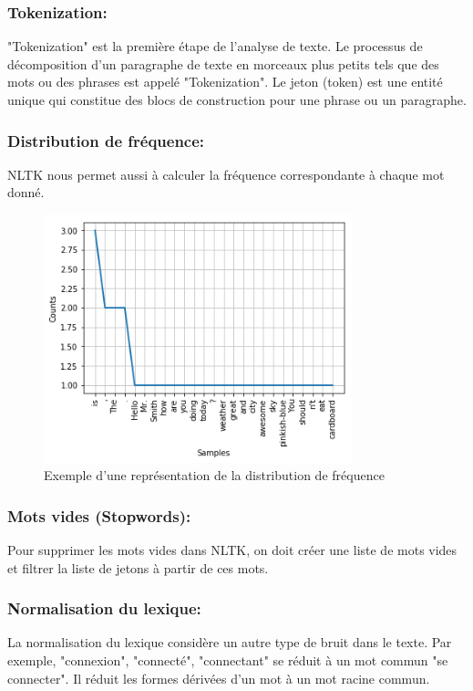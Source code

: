 \subsubsection{Tokenization:}
"Tokenization" est la première étape de l'analyse de texte. Le processus de décomposition d'un paragraphe de texte en morceaux plus petits tels que des mots ou des phrases est appelé "Tokenization". Le jeton (token) est une entité unique qui constitue des blocs de construction pour une phrase ou un paragraphe.
\subsubsection{Distribution de fréquence:}
NLTK nous permet aussi à calculer la fréquence correspondante à chaque mot donné.
\begin{figure}[H]
    \centering
    \includegraphics[width=0.8\textwidth]{chapitre3/assets/nltk-freq.png}
    \caption{Exemple d'une représentation de la distribution de fréquence}
    \label{fig:my_label}
\end{figure}
\subsubsection{Mots vides (Stopwords):}
Pour supprimer les mots vides dans NLTK, on doit créer une liste de mots vides et filtrer la liste de jetons à partir de ces mots.
\subsubsection{Normalisation du lexique:}
La normalisation du lexique considère un autre type de bruit dans le texte. Par exemple, "connexion", "connecté", "connectant" se réduit à un mot commun "se connecter". Il réduit les formes dérivées d'un mot à un mot racine commun.
